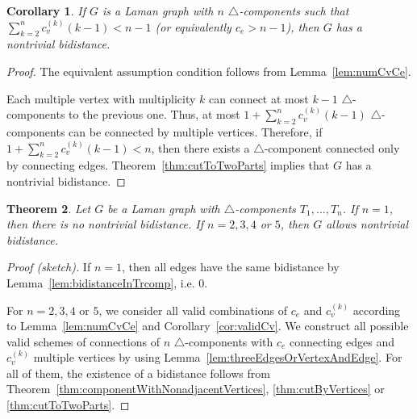\documentclass[a4paper, 11pt]{article}
\newcommand{\trcomp}{$\triangle$-component}
\newcommand{\trcomps}{$\triangle$-components}
\newcommand{\cv}[1]{c_v^{(#1)}}
\newtheorem{thm}{Theorem}[section]
\newtheorem{cor}[thm]{Corollary}
\theoremstyle{definition}
\begin{document}
\begin{cor}
If $G$ is a Laman graph with $n$ \trcomps{} such that $\sum_{k=2}^n \cv{k}(k-1) < n-1$ (or equivalently $c_e>n-1$), then $G$ has a nontrivial bidistance.
\end{cor}
\begin{proof}
The equivalent assumption condition follows from Lemma~\ref{lem:numCvCe}.

Each multiple vertex with multiplicity $k$ can connect at most $k-1$ \trcomps{} to the previous one. Thus, at most $1+\sum_{k=2}^n \cv{k}(k-1)$ \trcomps{} can be connected by multiple vertices. Therefore, if $1+\sum_{k=2}^n \cv{k}(k-1) <n$, then there exists a \trcomp{} connected only by connecting edges. Theorem~\ref{thm:cutToTwoParts} implies that $G$ has a nontrivial bidistance.
\end{proof}

\begin{thm}
Let $G$ be a Laman graph with \trcomps{} $T_1,\dots, T_n$. If $n=1$, then there is no nontrivial bidistance. If $n=2,3,4$ or $5$, then $G$ allows nontrivial bidistance.
\end{thm}
\begin{proof}[Proof (sketch)]
If $n=1$, then all edges have the same bidistance by Lemma~\ref{lem:bidistanceInTrcomp}, i.e. 0.

For $n=2,3,4$ or $5$, we consider all valid combinations of $c_e$ and $\cv{k}$ according to Lemma~\ref{lem:numCvCe} and Corollary~\ref{cor:validCv}. We construct all possible valid schemes of connections of $n$ \trcomps{} with $c_e$ connecting edges and $\cv{k}$ multiple vertices by using Lemma~\ref{lem:threeEdgesOrVertexAndEdge}. For all of them, the existence of a bidistance follows from Theorem~\ref{thm:componentWithNonadjacentVertices}, \ref{thm:cutByVertices} or \ref{thm:cutToTwoParts}.
\end{proof}
\end{document}
